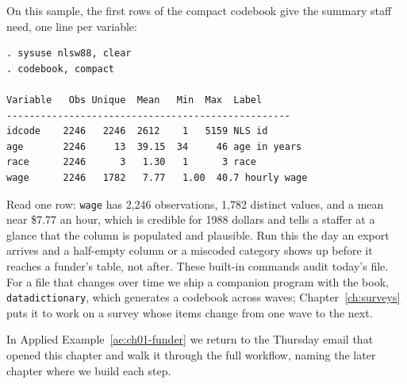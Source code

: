 On this sample, the first rows of the compact codebook give the summary staff need, one line per variable:
\par
{\footnotesize
\begin{verbatim}
. sysuse nlsw88, clear
. codebook, compact

Variable   Obs Unique  Mean   Min  Max  Label
--------------------------------------------------
idcode    2246   2246  2612    1   5159 NLS id
age       2246     13  39.15  34     46 age in years
race      2246      3   1.30   1      3 race
wage      2246   1782   7.77   1.00  40.7 hourly wage
\end{verbatim}
}
Read one row: \texttt{wage} has 2{,}246 observations, 1{,}782 distinct values, and a mean near \$7.77 an hour, which is credible for 1988 dollars and tells a staffer at a glance that the column is populated and plausible. Run this the day an export arrives and a half-empty column or a miscoded category shows up before it reaches a funder's table, not after. These built-in commands audit today's file. For a file that changes over time we ship a companion program with the book, \texttt{datadictionary}, which generates a codebook across waves; Chapter~\ref{ch:surveys} puts it to work on a survey whose items change from one wave to the next.

In Applied Example~\ref{ae:ch01-funder} we return to the Thursday email that opened this chapter and walk it through the full workflow, naming the later chapter where we build each step.

